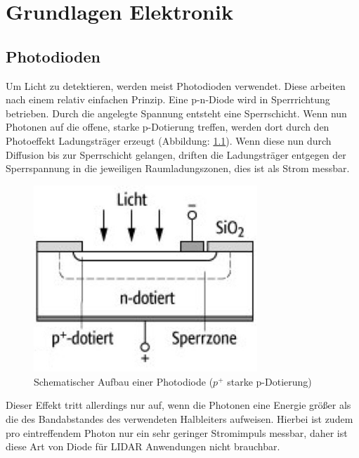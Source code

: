 
\chapter{Grundlagen Elektronik}\label{chap:grundlagen_et}
\section{Photodioden}\label{sec:photodioden}
Um Licht zu detektieren, werden meist Photodioden verwendet. Diese arbeiten nach einem relativ einfachen Prinzip.
Eine p-n-Diode wird in Sperrrichtung betrieben. Durch die angelegte Spannung entsteht eine Sperrschicht. Wenn nun Photonen auf die offene, starke p-Dotierung treffen, werden dort durch den Photoeffekt Ladungsträger erzeugt (Abbildung: \ref{photodiode}). Wenn diese nun durch Diffusion bis zur Sperrschicht gelangen, driften die Ladungsträger entgegen der Sperrspannung in die jeweiligen Raumladungszonen, dies ist als Strom messbar. \cite{Photodiode_spektrum}
\begin{figure}[H]
	\centering
	\includegraphics[width=0.75\textwidth]{images/GrundlagenLaserentfernungsmessung/Photodiode}
	\caption{Schematischer Aufbau einer Photodiode \cite{Photodiode_spektrum} ($p^+$ starke p-Dotierung)}
	\label{photodiode}
\end{figure}
Dieser Effekt tritt allerdings nur auf, wenn die Photonen eine Energie größer als die des Bandabstandes des verwendeten Halbleiters aufweisen. Hierbei ist zudem pro eintreffendem Photon nur ein sehr geringer Stromimpuls messbar, daher ist diese Art von Diode für \ac{LIDAR} Anwendungen nicht brauchbar.

